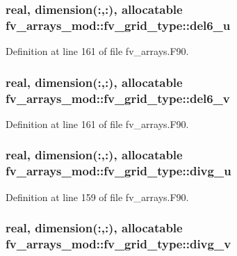\subsubsection[{del6\-\_\-u}]{\setlength{\rightskip}{0pt plus 5cm}real, dimension(\-:,\-:), allocatable fv\-\_\-arrays\-\_\-mod\-::fv\-\_\-grid\-\_\-type\-::del6\-\_\-u}\label{structfv__arrays__mod_1_1fv__grid__type_a0a50635625e1283ae8921ef1606b770d}


Definition at line 161 of file fv\-\_\-arrays.\-F90.

\subsubsection[{del6\-\_\-v}]{\setlength{\rightskip}{0pt plus 5cm}real, dimension(\-:,\-:), allocatable fv\-\_\-arrays\-\_\-mod\-::fv\-\_\-grid\-\_\-type\-::del6\-\_\-v}\label{structfv__arrays__mod_1_1fv__grid__type_af4578e602380c414292d93203313aaa3}


Definition at line 161 of file fv\-\_\-arrays.\-F90.

\subsubsection[{divg\-\_\-u}]{\setlength{\rightskip}{0pt plus 5cm}real, dimension(\-:,\-:), allocatable fv\-\_\-arrays\-\_\-mod\-::fv\-\_\-grid\-\_\-type\-::divg\-\_\-u}\label{structfv__arrays__mod_1_1fv__grid__type_a23614cd19fe0fe1b9d1c94fdc87eace8}


Definition at line 159 of file fv\-\_\-arrays.\-F90.

\subsubsection[{divg\-\_\-v}]{\setlength{\rightskip}{0pt plus 5cm}real, dimension(\-:,\-:), allocatable fv\-\_\-arrays\-\_\-mod\-::fv\-\_\-grid\-\_\-type\-::divg\-\_\-v}\label{structfv__arrays__mod_1_1fv__grid__type_a3203d6edb0bb98b83aca50bfea929e42}


